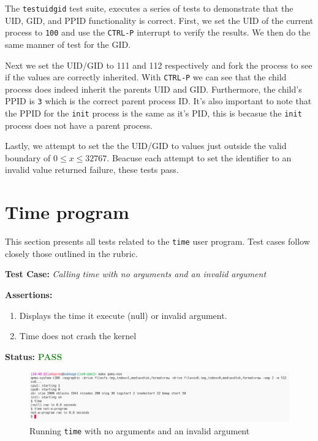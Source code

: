 \documentclass[11pt,letterpaper]{report}
\newcommand{\code}[1]{\colorbox{codegray}{\texttt{#1}}}
\begin{document}
{  The \code{testuidgid} test suite, executes a series of tests to demonstrate that the
  UID, GID, and PPID functionality is correct. First, we set the UID of the current process
  to \code{100} and use the \code{CTRL-P} interrupt to verify the results. We then do the same
  manner of test for the GID. 

  Next we set the UID/GID to 111 and 112 respectively and fork the
  process to see if the values are correctly inherited. With \code{CTRL-P} we can see that the
  child process does indeed inherit the parents UID and GID. Furthermore, the child's PPID is 
  \code{3} which is the correct parent process ID. It's also important to note that the 
  PPID for the \code{init} process is the same as it's PID, this is becasue the \code{init}
  process does not have a parent process.

  Lastly, we attempt to set the the UID/GID to values just outside the valid boundary of 
  $0 \leq x \leq 32767$. Beacuse each attempt to set the identifier to an invalid value 
  returned failure, these tests pass. 

  \section*{Time program}
  This section presents all tests related to the \code{time} user program.
  Test cases follow closely those outlined in the rubric. \hfill \break
  
  \noindent\textbf{Test Case:} \emph{Calling time with no arguments and an invalid argument}
  
  \noindent\textbf{Assertions:}
  \begin{enumerate}[]
  \item Displays the time it execute (null) or invalid argument. 
  \item Time does not crash the kernel
  \end{enumerate}  
  
  \noindent\textbf{Status:} \textcolor{ForestGreen}{\textbf{PASS}}
  
  \begin{figure}[h!]
	\centering
	\includegraphics[width=1\linewidth]{time1.png}
	\caption[img]{Running \code{time} with no arguments and an invalid argument}
	\label{fig:P1compileP0-1}
  \end{figure}

}
\end{document}
